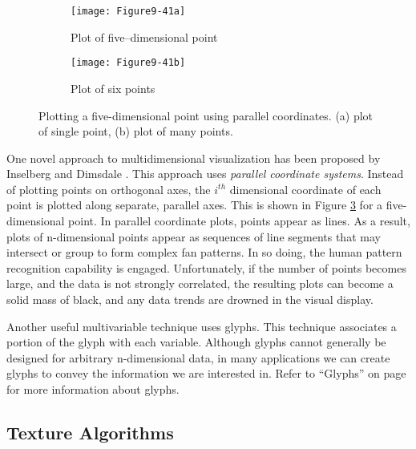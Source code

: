 \begin{figure}[htb]
	\begin{subfigure}[h]{0.48\linewidth}
		\texttt{[image: Figure9-41a]}
		\captionsetup{justification=centering}
		\caption{Plot of five--dimensional point}
		\label{fig:Figure9-41a}
	\end{subfigure}
	\hfill
	\begin{subfigure}[h]{0.48\linewidth}
		\texttt{[image: Figure9-41b]}
		\captionsetup{justification=centering}
		\caption{Plot of six points}
		\label{fig:Figure9-41b}
	\end{subfigure}
	\caption{Plotting a five-dimensional point using parallel coordinates. (a) plot of single point, (b) plot of many points.}\label{fig:Figure9-41}
\end{figure}

One novel approach to multidimensional visualization has been proposed by Inselberg and Dimsdale \cite{Inselberg87}. This approach uses \emph{parallel coordinate systems}. Instead of plotting points on orthogonal axes, the $i^{th}$ dimensional coordinate of each point is plotted along separate, parallel axes. This is shown in Figure \ref{fig:Figure9-41} for a five-dimensional point. In parallel coordinate plots, points appear as lines. As a result, plots of n-dimensional points appear as sequences of line segments that may intersect or group to form complex fan patterns. In so doing, the human pattern recognition capability is engaged. Unfortunately, if the number of points becomes large, and the data is not strongly correlated, the resulting plots can become a solid mass of black, and any data trends are drowned in the visual display.

Another useful multivariable technique uses glyphs. This technique associates a portion of the glyph with each variable. Although glyphs cannot generally be designed for arbitrary n-dimensional data, in many applications we can create glyphs to convey the information we are interested in. Refer to ``Glyphs'' on page \pageref{subsec:glyphs} for more information about glyphs.

\subsection{Texture Algorithms}
\label{subsec:texture_algorithms}

